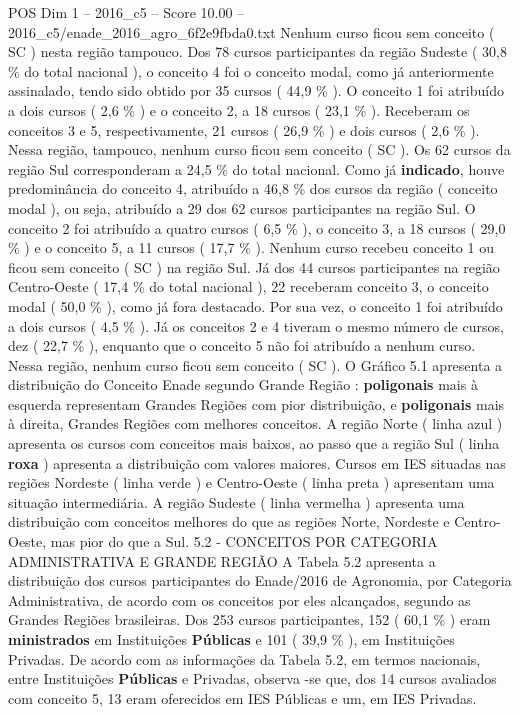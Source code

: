 \begin{textsample}{POS Dim 1 – 2016\_c5 – Score 10.00 – 2016\_c5/enade\_2016\_agro\_6f2e9fbda0.txt}
Nenhum curso ficou sem conceito ( SC ) nesta região tampouco.
Dos 78 cursos participantes da região Sudeste ( 30,8 \% do total nacional ), o conceito 4 foi o conceito modal, como já anteriormente assinalado, tendo sido obtido por 35 cursos ( 44,9 \% ).
O conceito 1 foi atribuído a dois cursos ( 2,6 \% ) e o conceito 2, a 18 cursos ( 23,1 \% ).
Receberam os conceitos 3 e 5, respectivamente, 21 cursos ( 26,9 \% ) e dois cursos ( 2,6 \% ).
Nessa região, tampouco, nenhum curso ficou sem conceito ( SC ).
Os 62 cursos da região Sul corresponderam a 24,5 \% do total nacional.
Como já \textbf{indicado}, houve predominância do conceito 4, atribuído a 46,8 \% dos cursos da região ( conceito modal ), ou seja, atribuído a 29 dos 62 cursos participantes na região Sul.
O conceito 2 foi atribuído a quatro cursos ( 6,5 \% ), o conceito 3, a 18 cursos ( 29,0 \% ) e o conceito 5, a 11 cursos ( 17,7 \% ).
Nenhum curso recebeu conceito 1 ou ficou sem conceito ( SC ) na região Sul.
Já dos 44 cursos participantes na região Centro-Oeste ( 17,4 \% do total nacional ), 22 receberam conceito 3, o conceito modal ( 50,0 \% ), como já fora destacado.
Por sua vez, o conceito 1 foi atribuído a dois cursos ( 4,5 \% ).
Já os conceitos 2 e 4 tiveram o mesmo número de cursos, dez ( 22,7 \% ), enquanto que o conceito 5 não foi atribuído a nenhum curso.
Nessa região, nenhum curso ficou sem conceito ( SC ).
O Gráfico 5.1 apresenta a distribuição do Conceito Enade segundo Grande Região : \textbf{poligonais} mais à esquerda representam Grandes Regiões com pior distribuição, e \textbf{poligonais} mais à direita, Grandes Regiões com melhores conceitos.
A região Norte ( linha azul ) apresenta os cursos com conceitos mais baixos, ao passo que a região Sul ( linha \textbf{roxa} ) apresenta a distribuição com valores maiores.
Cursos em IES situadas nas regiões Nordeste ( linha verde ) e Centro-Oeste ( linha preta ) apresentam uma situação intermediária.
A região Sudeste ( linha vermelha ) apresenta uma distribuição com conceitos melhores do que as regiões Norte, Nordeste e Centro-Oeste, mas pior do que a Sul. 5.2 - CONCEITOS POR CATEGORIA ADMINISTRATIVA E GRANDE REGIÃO A Tabela 5.2 apresenta a distribuição dos cursos participantes do Enade/2016 de Agronomia, por Categoria Administrativa, de acordo com os conceitos por eles alcançados, segundo as Grandes Regiões brasileiras.
Dos 253 cursos participantes, 152 ( 60,1 \% ) eram \textbf{ministrados} em Instituições \textbf{Públicas} e 101 ( 39,9 \% ), em Instituições Privadas.
De acordo com as informações da Tabela 5.2, em termos nacionais, entre Instituições \textbf{Públicas} e Privadas, observa -se que, dos 14 cursos avaliados com conceito 5, 13 eram oferecidos em IES Públicas e um, em IES Privadas.

\end{textsample}
